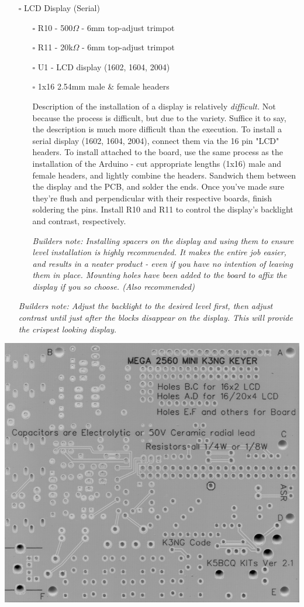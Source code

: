 \documentclass[11pt]{article}
\begin{document}
\begin{itemize}
\item[{$\square$}] LCD Display (Serial)
\begin{itemize}
\item[{$\square$}] R10 - 500\(\Omega\) - 6mm top-adjust trimpot
\item[{$\square$}] R11 - 20k\(\Omega\) - 6mm top-adjust trimpot
\item[{$\square$}] U1 - LCD display (1602, 1604, 2004)
\item[{$\square$}] 1x16 2.54mm male \& female headers

Description of the installation of a display is relatively \emph{difficult.}  Not because the process is difficult, but due to the variety.  Suffice it to say, the description is much more difficult than the execution.  To install a serial display (1602, 1604, 2004), connect them via the 16 pin "LCD" headers.  To install attached to the board, use the same process as the installation of the Arduino - cut appropriate lengths (1x16) male and female headers, and lightly combine the headers.  Sandwich them between the display and the PCB, and solder the ends.  Once you've made sure they're flush and perpendicular with their respective boards, finish soldering the pins.  Install R10 and R11 to control the display's backlight and contrast, respectively.

\emph{Builders note:  Installing spacers on the display and using them to ensure level installation is highly recommended.  It makes the entire job easier, and results in a neater product - even if you have no intention of leaving them in place.  Mounting holes have been added to the board to affix the display if you so choose.  (Also recommended)}
\end{itemize}

\emph{Builders note:  Adjust the backlight to the desired level first, then adjust contrast until just after the blocks disappear on the display.  This will provide the crispest looking display.}
\end{itemize}
\begin{center}
\includegraphics[width=.9\linewidth]{../png/3.4/pcb-bot-display-serial.png}
\end{center}
\end{document}
